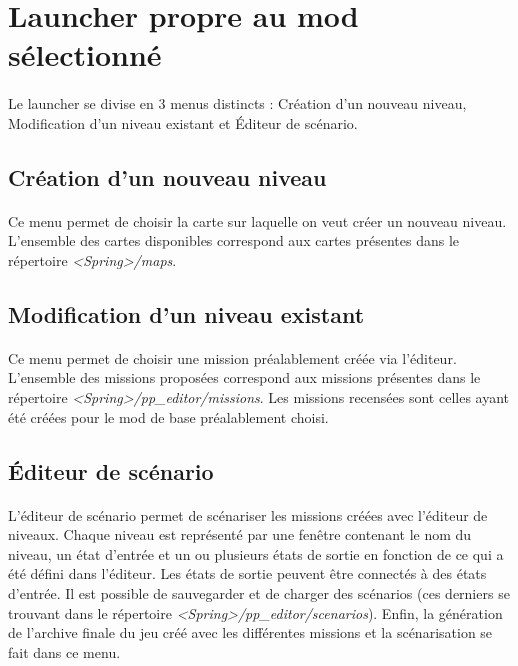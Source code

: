 \documentclass[a4paper]{article}
\begin{document}
\section{Launcher propre au mod sélectionné}
\paragraph{ }
Le launcher se divise en 3 menus distincts : Création d'un nouveau niveau, Modification d'un niveau existant et Éditeur de scénario.
\subsection{Création d'un nouveau niveau}
\paragraph{ }
Ce menu permet de choisir la carte sur laquelle on veut créer un nouveau niveau. L'ensemble des cartes disponibles correspond aux cartes présentes dans le répertoire \textit{<Spring>/maps}.
\subsection{Modification d'un niveau existant}
\paragraph{ }
Ce menu permet de choisir une mission préalablement créée via l'éditeur. L'ensemble des missions proposées correspond aux missions présentes dans le répertoire \textit{<Spring>/pp\_editor/missions}. Les missions recensées sont celles ayant été créées pour le mod de base préalablement choisi.
\subsection{Éditeur de scénario}
\paragraph{ }
L'éditeur de scénario permet de scénariser les missions créées avec l'éditeur de niveaux. Chaque niveau est représenté par une fenêtre contenant le nom du niveau, un état d'entrée et un ou plusieurs états de sortie en fonction de ce qui a été défini dans l'éditeur. Les états de sortie peuvent être connectés à des états d'entrée. Il est possible de sauvegarder et de charger des scénarios (ces derniers se trouvant dans le répertoire \textit{<Spring>/pp\_editor/scenarios}). Enfin, la génération de l'archive finale du jeu créé avec les différentes missions et la scénarisation se fait dans ce menu.
\end{document}

